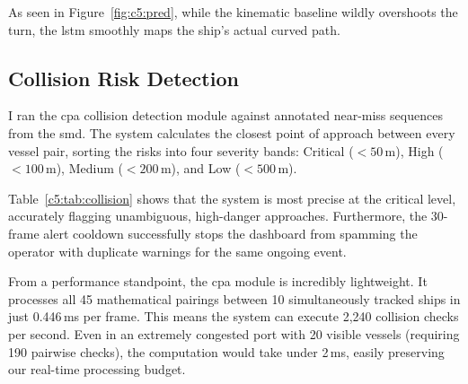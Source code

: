 As seen in Figure~\ref{fig:c5:pred}, while the kinematic baseline wildly overshoots the turn, the \gls{lstm} smoothly maps the ship's actual curved path.

\subsection{Collision Risk Detection}

I ran the \gls{cpa} collision detection module against annotated near-miss sequences from the \gls{smd}. The system calculates the closest point of approach between every vessel pair, sorting the risks into four severity bands: Critical ($< 50$\,m), High ($< 100$\,m), Medium ($< 200$\,m), and Low ($< 500$\,m).

\begin{table}[H]
\fontsize{10}{12}\selectfont
\centering
\caption{Collision risk detection results by risk level on annotated 
\gls{smd} near-miss sequences}
\label{c5:tab:collision}
\end{table}

Table~\ref{c5:tab:collision} shows that the system is most precise at the critical level, accurately flagging unambiguous, high-danger approaches. Furthermore, the 30-frame alert cooldown successfully stops the dashboard from spamming the operator with duplicate warnings for the same ongoing event.

From a performance standpoint, the \gls{cpa} module is incredibly lightweight. It processes all 45 mathematical pairings between 10 simultaneously tracked ships in just 0.446\,ms per frame. This means the system can execute 2,240 collision checks per second. Even in an extremely congested port with 20 visible vessels (requiring 190 pairwise checks), the computation would take under 2\,ms, easily preserving our real-time processing budget.

